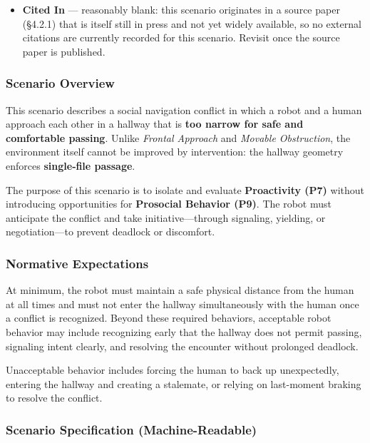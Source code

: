 \documentclass[utf8]{frontiers_suppmat} %
\providecommand{\tightlist}{%
  \setlength{\itemsep}{0pt}\setlength{\parskip}{0pt}}
\begin{document}
\begin{itemize}
\tightlist
\item
  \textbf{Cited In} --- reasonably blank: this scenario originates in a
  source paper (§4.2.1) that is itself still in press and not yet widely
  available, so no external citations are currently recorded for this
  scenario. Revisit once the source paper is published.
\end{itemize}

\subsubsection{Scenario Overview}\label{scenario-overview}

This scenario describes a social navigation conflict in which a robot
and a human approach each other in a hallway that is \textbf{too narrow
for safe and comfortable passing}. Unlike \emph{Frontal Approach} and
\emph{Movable Obstruction}, the environment itself cannot be improved by
intervention: the hallway geometry enforces \textbf{single‑file
passage}.

The purpose of this scenario is to isolate and evaluate
\textbf{Proactivity (P7)} without introducing opportunities for
\textbf{Prosocial Behavior (P9)}. The robot must anticipate the conflict
and take initiative---through signaling, yielding, or negotiation---to
prevent deadlock or discomfort.

\subsubsection{Normative Expectations}\label{normative-expectations}

At minimum, the robot must maintain a safe physical distance from the
human at all times and must not enter the hallway simultaneously with
the human once a conflict is recognized. Beyond these required
behaviors, acceptable robot behavior may include recognizing early that
the hallway does not permit passing, signaling intent clearly, and
resolving the encounter without prolonged deadlock.

Unacceptable behavior includes forcing the human to back up
unexpectedly, entering the hallway and creating a stalemate, or relying
on last-moment braking to resolve the conflict.

\subsubsection{Scenario Specification
(Machine-Readable)}\label{scenario-specification-machine-readable}
\end{document}
